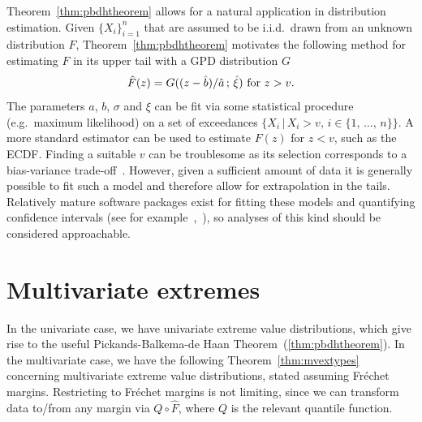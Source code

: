 \documentclass[11pt,twoside,openany]{book}
\newcommand{\citeay}[1]{\citeauthor{#1},~\citeyear{#1}}
\numberwithin{Theorem}{chapter}
\numberwithin{Definition}{chapter}
\numberwithin{Lemma}{chapter}
\numberwithin{Algorithm}{chapter}
\numberwithin{equation}{chapter}
\begin{document}
Theorem~\ref{thm:pbdhtheorem}
allows for a natural application in distribution estimation. Given
$\{X_i\}_{i=1}^n$ that are assumed to be i.i.d.\ drawn from an unknown distribution
$F$, Theorem~\ref{thm:pbdhtheorem} motivates the following method for estimating $F$ in
its upper tail with a GPD distribution $G$
\begin{equation}\label{eq:fhat_univariate}
  \hat F(z) = G((z - \hat b)/\hat a\,;\, \hat\xi)  \text{ for } z > v.\\
\end{equation}
The parameters $a$, $b$, $\sigma$ and $\xi$ can be fit via some statistical
procedure (e.g.\ maximum likelihood) on a set of exceedances $\{X_i\,|\, X_i >
v,\,i\in\{1,\,\ldots,\,n\}\}$. A more standard estimator can be used to
estimate $F(z)$ for $z < v$, such as
the ECDF.
Finding a suitable $v$ can be troublesome
as its selection corresponds to a bias-variance trade-off~\citep{coles2001introduction}.
However, given a sufficient amount of data it is generally possible to
fit such a model and therefore allow for extrapolation in the tails.
Relatively mature software packages exist for fitting these models and quantifying confidence
intervals (see for example~\citeay{mev}), so analyses of this kind should be considered
approachable.

\section{Multivariate extremes}

In the univariate case, we have univariate extreme value distributions,
which give rise to the useful Pickands-Balkema-de Haan Theorem~(\ref{thm:pbdhtheorem}).
In the multivariate case, we have the following Theorem~\ref{thm:mvextypes} concerning
multivariate extreme value distributions, stated assuming Fréchet margins.
Restricting to Fréchet margins is not limiting, since we can
transform data to/from any margin via $ Q \circ \hat F$, where $Q$ is the relevant
quantile function.
\end{document}
